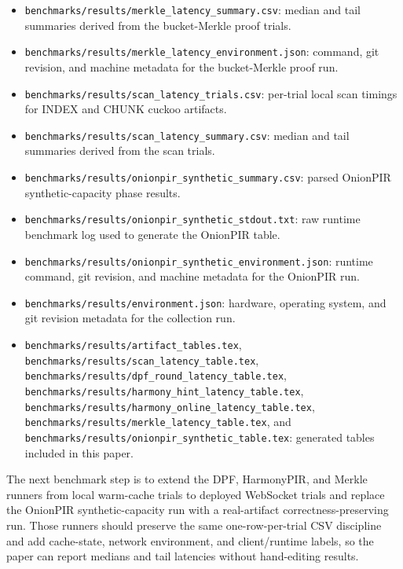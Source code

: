 \begin{itemize}[nolistsep,leftmargin=*]
    \item \texttt{benchmarks/results/merkle\_latency\_summary.csv}: median and tail summaries derived from the bucket-Merkle proof trials.
    \item \texttt{benchmarks/results/merkle\_latency\_environment.json}: command, git revision, and machine metadata for the bucket-Merkle proof run.
    \item \texttt{benchmarks/results/scan\_latency\_trials.csv}: per-trial local scan timings for INDEX and CHUNK cuckoo artifacts.
    \item \texttt{benchmarks/results/scan\_latency\_summary.csv}: median and tail summaries derived from the scan trials.
    \item \texttt{benchmarks/results/onionpir\_synthetic\_summary.csv}: parsed OnionPIR synthetic-capacity phase results.
    \item \texttt{benchmarks/results/onionpir\_synthetic\_stdout.txt}: raw runtime benchmark log used to generate the OnionPIR table.
    \item \texttt{benchmarks/results/onionpir\_synthetic\_environment.json}: runtime command, git revision, and machine metadata for the OnionPIR run.
    \item \texttt{benchmarks/results/environment.json}: hardware, operating system, and git revision metadata for the collection run.
    \item \texttt{benchmarks/results/artifact\_tables.tex}, \texttt{benchmarks/results/scan\_latency\_table.tex}, \texttt{benchmarks/results/dpf\_round\_latency\_table.tex}, \texttt{benchmarks/results/harmony\_hint\_latency\_table.tex}, \texttt{benchmarks/results/harmony\_online\_latency\_table.tex}, \texttt{benchmarks/results/merkle\_latency\_table.tex}, and \texttt{benchmarks/results/onionpir\_synthetic\_table.tex}: generated tables included in this paper.
\end{itemize}

The next benchmark step is to extend the DPF, HarmonyPIR, and Merkle runners from local warm-cache trials to deployed WebSocket trials and replace the OnionPIR synthetic-capacity run with a real-artifact correctness-preserving run. Those runners should preserve the same one-row-per-trial CSV discipline and add cache-state, network environment, and client/runtime labels, so the paper can report medians and tail latencies without hand-editing results.

